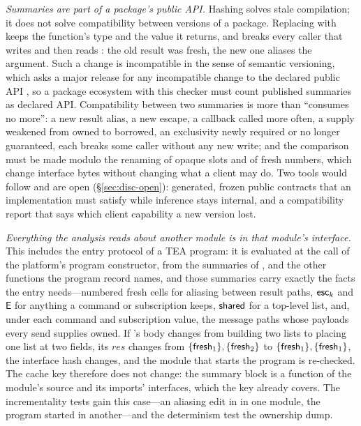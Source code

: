 \emph{Summaries are part of a package's public API.} Hashing solves stale compilation; it does not solve
compatibility between versions of a package. Replacing  with
 keeps the function's type and the value it returns, and breaks every caller that
writes  and then reads : the old result was fresh, the new one
aliases the argument. Such a change is incompatible in the sense of semantic versioning, which asks a
major release for any incompatible change to the declared public API \citep{semver2}, so a package
ecosystem with this checker must count published summaries as declared API. Compatibility between two
summaries is more than ``consumes no more'': a new result alias, a new escape, a callback called more
often, a supply weakened from owned to borrowed, an exclusivity newly required or no longer guaranteed, each
breaks some caller without any new write; and the comparison must be made modulo the renaming of opaque
slots and of fresh numbers, which change interface bytes without changing what a client may do. Two tools
would follow and are open (\S\ref{sec:disc-open}): generated, frozen public contracts that an
implementation must satisfy while inference stays internal, and a compatibility report that says which
client capability a new version lost.

\emph{Everything the analysis reads about another module is in that module's interface.} This
includes the entry protocol of a TEA program: it is evaluated at the call of the platform's program
constructor, from the summaries of ,  and the other functions the program
record names, and those summaries carry exactly the facts the entry needs---numbered fresh cells for
aliasing between result paths, $\mathsf{esc}_k$ and $\mathsf{E}$ for anything a command or subscription keeps,
$\mathsf{shared}$ for a top-level list, and, under each command and subscription value, the message paths whose
payloads every send supplies owned. If 's body changes from building two lists to placing
one list at two fields, its $\mathit{res}$ changes from $\{\mathsf{fresh}_1\}, \{\mathsf{fresh}_2\}$ to
$\{\mathsf{fresh}_1\}, \{\mathsf{fresh}_1\}$, the interface hash changes, and the module that starts the program is
re-checked. The cache key therefore does not change: the summary block is a function of the module's
source and its imports' interfaces, which the key already covers. The incrementality tests gain this
case---an aliasing edit in  in one module, the program started in another---and the
determinism test the ownership dump.

